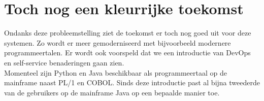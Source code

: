 \section{Toch nog een kleurrijke toekomst}
\label{sec:kleurrijke-toekomst}
Ondanks deze probleemstelling ziet de toekomst er toch nog goed uit voor deze systemen. Zo wordt er meer gemoderniseerd met bijvoorbeeld modernere programmeertalen. Er wordt ook voorspeld dat we een introductie van DevOps en self-service benaderingen gaan zien. \autocite{Pennaz2023} \\

Momenteel zijn Python en Java beschikbaar als programmeertaal op de mainframe naast PL/1 en COBOL.
Sinds deze introductie past al bijna tweederde van de gebruikers op de mainframe Java op een bepaalde manier toe. \autocite{Watts2018} 





